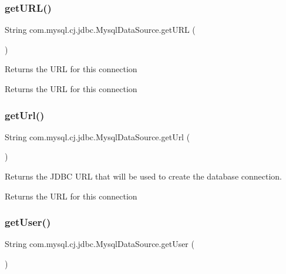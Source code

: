 \subsubsection{\texorpdfstring{get\+U\+R\+L()}{getURL()}}
{\footnotesize\ttfamily String com.\+mysql.\+cj.\+jdbc.\+Mysql\+Data\+Source.\+get\+U\+RL (\begin{DoxyParamCaption}{ }\end{DoxyParamCaption})}

Returns the U\+RL for this connection

\begin{DoxyReturn}{Returns}
the U\+RL for this connection 
\end{DoxyReturn}
\mbox{\label{classcom_1_1mysql_1_1cj_1_1jdbc_1_1_mysql_data_source_a5baa5243975b05f88cdb631c88a60185}} 
\subsubsection{\texorpdfstring{get\+Url()}{getUrl()}}
{\footnotesize\ttfamily String com.\+mysql.\+cj.\+jdbc.\+Mysql\+Data\+Source.\+get\+Url (\begin{DoxyParamCaption}{ }\end{DoxyParamCaption})}

Returns the J\+D\+BC U\+RL that will be used to create the database connection.

\begin{DoxyReturn}{Returns}
the U\+RL for this connection 
\end{DoxyReturn}
\mbox{\label{classcom_1_1mysql_1_1cj_1_1jdbc_1_1_mysql_data_source_a22e84365059e1c1e6e29c9999a31d6b0}} 
\subsubsection{\texorpdfstring{get\+User()}{getUser()}}
{\footnotesize\ttfamily String com.\+mysql.\+cj.\+jdbc.\+Mysql\+Data\+Source.\+get\+User (\begin{DoxyParamCaption}{ }\end{DoxyParamCaption})}

